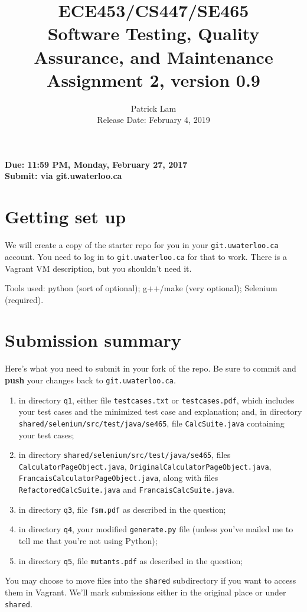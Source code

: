 \documentclass[10pt,hidelinks]{article}
\begin{document}
\title{
ECE453/CS447/SE465 \\
Software Testing, Quality Assurance, and Maintenance\\
Assignment 2, version 0.9}
\author{Patrick Lam \\
{Release Date:  February 4, 2019} \\
}
\renewcommand{\today}{}
\maketitle

\begin{center}

{\bf Due:  11:59 PM, Monday, February 27, 2017} \\
{\bf Submit: via git.uwaterloo.ca }\\
\end{center}

\section*{Getting set up}
We will create a copy of the starter repo for you in your {\tt git.uwaterloo.ca} account. You need to log in to {\tt git.uwaterloo.ca} for that to work. There is a Vagrant VM description,
but you shouldn't need it.

Tools used: python (sort of optional); g++/make (very optional); Selenium (required).

\section*{Submission summary}
Here's what you need to submit in your fork of the repo. Be sure to commit
and {\bf push} your changes back to {\tt git.uwaterloo.ca}.
\begin{enumerate}
\item in directory {\tt q1}, either file {\tt testcases.txt} or {\tt testcases.pdf}, which includes your test cases and the minimized test case and explanation; and, in directory {\tt shared/selenium/src/test/java/se465}, file {\tt CalcSuite.java} containing your test cases;
\item in directory {\tt shared/selenium/src/test/java/se465}, files {\tt CalculatorPageObject.java}, {\tt OriginalCalculatorPageObject.java}, {\tt FrancaisCalculatorPageObject.java}, along with files {\tt RefactoredCalcSuite.java} and {\tt FrancaisCalcSuite.java}.
\item in directory {\tt q3}, file {\tt fsm.pdf} as described in the question;
\item in directory {\tt q4}, your modified {\tt generate.py} file (unless you've mailed me to tell me that you're not using Python);
\item in directory {\tt q5}, file {\tt mutants.pdf} as described in the question;
\end{enumerate}
You may choose to move files into the {\tt shared} subdirectory if you want to access them in Vagrant. We'll mark submissions either in the original place or under {\tt shared}.
 
\end{document}

